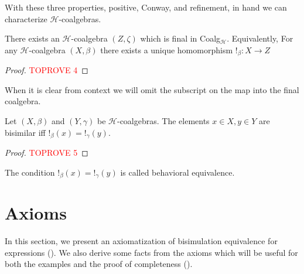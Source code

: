 \documentclass[a4paper,UKenglish,cleveref, autoref, thm-restate]{lipics-v2021}
\newcommand{\wgkat}{\textsf{\upshape{wGKAT}}\xspace}
\theoremstyle{plain}\newtheoremrep{thm}{Theorem}[section]
\begin{document}
	\begin{toappendix}
		With these three properties, positive, Conway, and refinement, in hand we can characterize $\mathcal H$-coalgebras.
		
		\begin{prop}
			There exists an $\mathcal{H}$-coalgebra $(Z, \zeta)$ which is final in Coalg$_{\mathcal{H}}$. Equivalently, For any $\mathcal{H}$-coalgebra $(X, \beta)$ there exists a unique homomorphism $!_{\beta}:X\to Z$ 
		\end{prop}
		\begin{proof}\textcolor{red}{TOPROVE 4}\end{proof}
		When it is clear from context we will omit the subscript on the map into the final coalgebra.
		\begin{prop}
			Let $(X, \beta)$ and $(Y, \gamma)$ be $\mathcal{H}$-coalgebras. The elements $x \in X, y \in Y$ are bisimilar iff $!_\beta(x) = !_\gamma(y)$. \label{bisimIffBeh}
		\end{prop}
		\begin{proof}\textcolor{red}{TOPROVE 5}\end{proof}
		The condition $!_\beta(x) = !_\gamma(y)$ is called behavioral equivalence.
	\end{toappendix} 
	
	\section{Axioms}\label{axiomsS}
	In this section, we present an axiomatization of bisimulation equivalence for \wgkat expressions (). We also derive some facts from the axioms which will be useful for both the examples and the proof of completeness (). 
	
\end{document}
